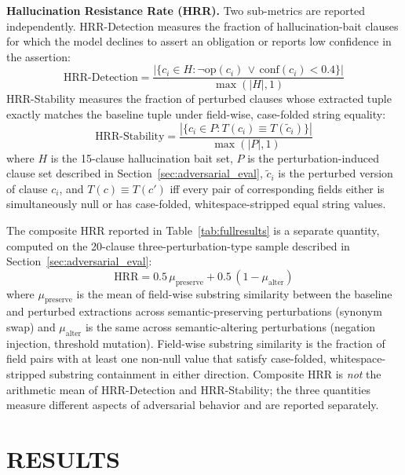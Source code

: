 \documentclass{article}
\begin{document}
\textbf{Hallucination Resistance Rate (HRR).}
Two sub-metrics are reported independently.
HRR-Detection measures the fraction of hallucination-bait clauses for
which the model declines to assert an obligation or reports low
confidence in the assertion:
\begin{equation}
\text{HRR-Detection} = \frac{|\{c_i \in H :
  \neg\mathrm{op}(c_i) \,\lor\, \mathrm{conf}(c_i) < 0.4\}|}{\max(|H|, 1)}
\label{eq:hrrdet}
\end{equation}
HRR-Stability measures the fraction of perturbed clauses whose
extracted tuple exactly matches the baseline tuple under field-wise,
case-folded string equality:
\begin{equation}
\text{HRR-Stability} = \frac{|\{c_i \in P :
  T(c_i) \equiv T(\tilde{c}_i)\}|}{\max(|P|, 1)}
\label{eq:hrrstab}
\end{equation}
where $H$ is the 15-clause hallucination bait set, $P$ is the
perturbation-induced clause set described in
Section~\ref{sec:adversarial_eval}, $\tilde{c}_i$ is the perturbed
version of clause $c_i$, and $T(c) \equiv T(c')$ iff every pair of
corresponding fields either is simultaneously null or has
case-folded, whitespace-stripped equal string values.

The composite HRR reported in Table~\ref{tab:fullresults} is a
separate quantity, computed on the 20-clause three-perturbation-type
sample described in Section~\ref{sec:adversarial_eval}:
\begin{equation}
\text{HRR} = 0.5\,\mu_{\text{preserve}} + 0.5\,(1 - \mu_{\text{alter}})
\label{eq:hrrcomp}
\end{equation}
where $\mu_{\text{preserve}}$ is the mean of field-wise substring
similarity between the baseline and perturbed extractions across
semantic-preserving perturbations (synonym swap) and
$\mu_{\text{alter}}$ is the same across semantic-altering
perturbations (negation injection, threshold mutation).
Field-wise substring similarity is the fraction of field pairs with
at least one non-null value that satisfy case-folded,
whitespace-stripped substring containment in either direction.
Composite HRR is \emph{not} the arithmetic mean of
HRR-Detection and HRR-Stability; the three quantities measure
different aspects of adversarial behavior and are reported separately.

\section{RESULTS}
\label{sec:results}
\end{document}
